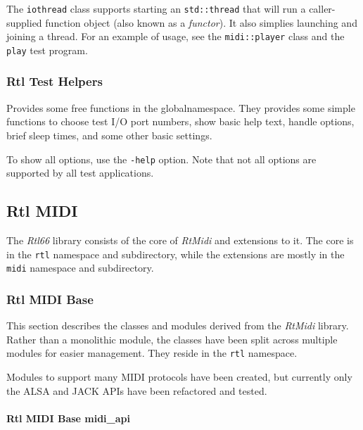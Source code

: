    The \texttt{iothread} class supports starting an
   \texttt{std::thread} that will run a caller-supplied function object
   (also known as a \textsl{functor}).
   It also simplies launching and joining a thread.
   For an example of usage, see the \texttt{midi::player} class and
   the \texttt{play} test program.

\subsubsection{Rtl Test Helpers}
\label{subsubsec:rtl_test_helpers}

   Provides some free functions in the globalnamespace.
   They provides some simple functions to choose test I/O port numbers,
   show basic help text, handle options, brief sleep times,
   and some other basic settings.

   To show all options, use the \texttt{-\-help} option.
   Note that not all options are supported by all test applications.

\subsection{Rtl MIDI}
\label{subsec:rtl_midi}

   The \textsl{Rtl66} library consists of the core of \textsl{RtMidi} and
   extensions to it. The core is in the \texttt{rtl} namespace and
   subdirectory, while
   the extensions are mostly in the \texttt{midi} namespace and
   subdirectory.

\subsubsection{Rtl MIDI Base}
\label{subsubsec:rtl_midi_base}

   This section describes the classes and modules derived from the
   \textsl{RtMidi} library.
   Rather than a monolithic module, the classes have been split across
   multiple modules for easier management.
   They reside in the \texttt{rtl} namespace.

   Modules to support many MIDI protocols have been created, but
   currently only the ALSA and JACK APIs have been refactored
   and tested.

\paragraph{Rtl MIDI Base midi\_api}
\label{paragraph:rtl_midi_midi_api}

